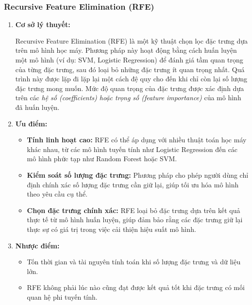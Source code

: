 \documentclass[13pt]{article}
\begin{document}
\subsubsection{Recursive Feature Elimination (RFE)}
\begin{enumerate}
    \item \textbf{Cơ sở lý thuyết: }

    Recursive Feature Elimination (RFE) là một kỹ thuật chọn lọc đặc trưng dựa trên mô hình học máy. Phương pháp này hoạt động bằng cách huấn luyện một mô hình (ví dụ: SVM, Logistic Regression) để đánh giá tầm quan trọng của từng đặc trưng, sau đó loại bỏ những đặc trưng ít quan trọng nhất. Quá trình này được lặp đi lặp lại một cách đệ quy cho đến khi chỉ còn lại số lượng đặc trưng mong muốn. Mức độ quan trọng của đặc trưng được xác định dựa trên các \textit{hệ số (coefficients) hoặc trọng số (feature importance)} của mô hình đã huấn luyện.
    
    \item \textbf{Ưu điểm: }
    \begin{itemize}
        \item \textbf{Tính linh hoạt cao: } RFE có thể áp dụng với nhiều thuật toán học máy khác nhau, từ các mô hình tuyến tính như Logistic Regression đến các mô hình phức tạp như Random Forest hoặc SVM.
        \item \textbf{Kiểm soát số lượng đặc trưng: } Phương pháp cho phép người dùng chỉ định chính xác số lượng đặc trưng cần giữ lại, giúp tối ưu hóa mô hình theo yêu cầu cụ thể.
        \item \textbf{Chọn đặc trưng chính xác: } RFE loại bỏ đặc trưng dựa trên kết quả thực tế từ mô hình huấn luyện, giúp đảm bảo rằng các đặc trưng giữ lại thực sự có giá trị trong việc cải thiện hiệu suất mô hình.
    \end{itemize}
    \item \textbf{Nhược điểm: }
    \begin{itemize}
        \item Tốn thời gian và tài nguyên tính toán khi số lượng đặc trưng và dữ liệu lớn. 
        \item RFE không phải lúc nào cũng đạt được kết quả tốt khi đặc trưng có mối quan hệ phi tuyến tính.
    \end{itemize}
\end{enumerate}
\end{document}
